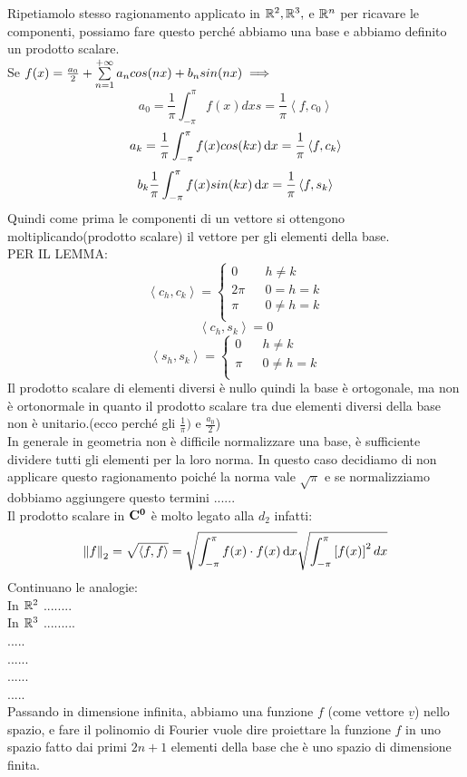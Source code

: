 Ripetiamolo stesso ragionamento applicato in $ \mathbb{R}^2, \mathbb{R}^3,$ e $ \mathbb{R}^n$ per ricavare le componenti, possiamo fare questo perché abbiamo una base e abbiamo definito un prodotto scalare.\\
Se $f(x)=\frac{a_0}{2}+\sum\limits_{n=1}^{+\infty}a_{n}cos(nx)+b_{n}sin(nx) \implies $
\[a_0=\frac{1}{\pi}\int_{-\pi}^{\pi}f(x)dxs=\frac{1}{\pi}\left<f,c_0\right> \]
\[a_k=\frac{1}{\pi}\int_{-\pi}^{\pi}f(x)cos(kx)\,\mathrm{d}{x}=\frac{1}{\pi}\left<f,c_k\right> \]
\[b_k\frac{1}{\pi}\int_{-\pi}^{\pi}f(x)sin(kx)\,\mathrm{d}{x}=\frac{1}{\pi}\left<f,s_k\right>\]
Quindi come prima le componenti di un vettore si ottengono moltiplicando(prodotto scalare) il vettore per gli elementi della base.\\
PER IL LEMMA:\\
\[
\left<c_h,c_k\right>=
\left\{\begin{matrix}
0&&h\ne k\\
2\pi&&0=h=k\\
\pi&&0\ne h=k\\
\end{matrix}\right.
\]
\[ \left<c_h,s_k\right>=0\]
\[
\left<s_h,s_k\right>=
\left\{\begin{matrix}
0&&h\ne k\\
\pi&&0\ne h=k\\
\end{matrix}\right.
\]
Il prodotto scalare di elementi diversi è nullo quindi la base è ortogonale, ma non è ortonormale in quanto il prodotto scalare tra due elementi diversi della base non è unitario.(ecco perché gli $\frac{1}{\pi})$ e $\frac{a_0}{2}$)\\
In generale in geometria non è difficile normalizzare una base, è sufficiente dividere tutti gli elementi per la loro norma. In questo caso decidiamo di non applicare questo ragionamento poiché la norma vale $\sqrt{\pi}$ e se normalizziamo dobbiamo aggiungere questo termini ......\\
Il prodotto scalare in $\mathbf{C^{0}}$ è molto legato alla $d_2$ infatti:
\[\left\|f\right\|_2=\sqrt{\left<f,f\right>}=\sqrt{\int_{-\pi}^{\pi}f(x)\cdot f(x)\,\mathrm{d}{x}}\sqrt{\int_{-\pi}^{\pi}\left[f(x)\right]^2dx}\]
Continuano le analogie:\\
In $ \mathbb{R}^2$ ........\\
In $ \mathbb{R}^3$ .........\\
.....\\
......\\
......\\
.....\\
Passando in dimensione infinita, abbiamo una funzione $f$ (come vettore $\underline{v}$) nello spazio, e fare il polinomio di Fourier  vuole dire proiettare la funzione $f$ in uno spazio fatto dai primi $2n+1$ elementi della base che è uno spazio di dimensione finita.\\
